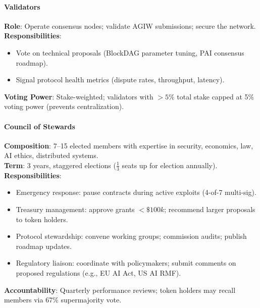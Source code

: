 \documentclass[11pt]{article}
\begin{document}
\begin{itemize}[noitemsep]
\begin{itemize}[noitemsep]
\begin{itemize}[noitemsep]
\paragraph{Validators}
\textbf{Role}: Operate consensus nodes; validate AGIW submissions; secure the network.\\
\textbf{Responsibilities}:
\begin{itemize}[noitemsep]
  \item Vote on technical proposals (BlockDAG parameter tuning, PAI consensus roadmap).
  \item Signal protocol health metrics (dispute rates, throughput, latency).
\end{itemize}
\textbf{Voting Power}: Stake-weighted; validators with $>5\%$ total stake capped at 5\% voting power (prevents centralization).

\paragraph{Council of Stewards}
\textbf{Composition}: 7--15 elected members with expertise in security, economics, law, AI ethics, distributed systems.\\
\textbf{Term}: 3 years, staggered elections ($\frac{1}{3}$ seats up for election annually).\\
\textbf{Responsibilities}:
\begin{itemize}[noitemsep]
  \item Emergency response: pause contracts during active exploits (4-of-7 multi-sig).
  \item Treasury management: approve grants $<\$100k$; recommend larger proposals to token holders.
  \item Protocol stewardship: convene working groups; commission audits; publish roadmap updates.
  \item Regulatory liaison: coordinate with policymakers; submit comments on proposed regulations (e.g., EU AI Act, US AI RMF).
\end{itemize}
\textbf{Accountability}: Quarterly performance reviews; token holders may recall members via 67\% supermajority vote.


\end{itemize}
\end{itemize}
\end{itemize}
\end{document}

